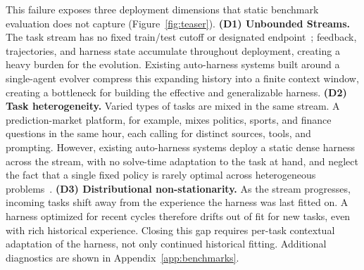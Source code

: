 This failure exposes three deployment dimensions that static benchmark evaluation does not capture (Figure~\ref{fig:teaser}). \textbf{(D1) Unbounded Streams.} The task stream has no fixed train/test cutoff or designated endpoint~\cite{karten2026continual,wang2023voyager}; feedback, trajectories, and harness state accumulate throughout deployment, creating a heavy burden for the evolution.
{Existing auto-harness systems built around a single-agent evolver compress this expanding history into a finite context window, creating a bottleneck for building the effective and generalizable harness. } 
\textbf{(D2) Task heterogeneity.} 
Varied types of tasks are mixed in the same stream. A prediction-market platform, for example, mixes politics, sports, and finance questions in the same hour, each calling for distinct sources, tools, and prompting. However, existing auto-harness systems deploy a static dense harness across the stream, with no solve-time adaptation to the task at hand, and neglect the fact that a single fixed policy is rarely optimal across heterogeneous problems~\cite{miao2025reinforcement}.
\textbf{(D3) Distributional non-stationarity.} As the stream progresses, incoming tasks shift away from the experience the harness was last fitted on. A harness optimized for recent cycles therefore drifts out of fit for new tasks, even with rich historical experience. Closing this gap requires per-task contextual adaptation of the harness, not only continued historical fitting. Additional diagnostics are shown in Appendix~\ref{app:benchmarks}.



